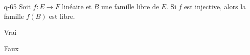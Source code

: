 \begin{truefalse}{q-65}
Soit $f : E \to F$ linéaire et $B$  une famille libre de $E$. Si  $f$ est injective, alors la famille $f(B)$ est  libre.
\item* Vrai
\item Faux
\end{truefalse}

